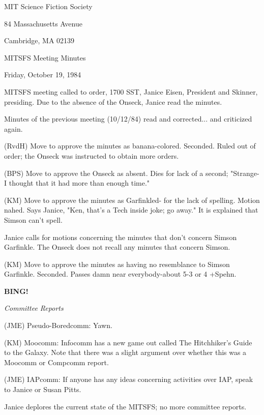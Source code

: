 \documentclass[12pt]{article}
\newcommand{\bing}{{\bf BING!} }
\newcommand{\goto}[1]{\bing \vskip 12pt \centerline{{\em{#1}}}}
\begin{document}
\begin{center}

MIT Science Fiction Society 

84 Massachusetts Avenue

Cambridge, MA 02139

\vspace{12pt}

MITSFS Meeting Minutes 

Friday, October 19, 1984

\end{center}
 
\vspace{18pt}

\setlength{\parskip}{6pt}

\noindent
MITSFS meeting called to order, 1700 SST,
Janice Eisen, President and Skinner, presiding. Due to the absence of the Onseck, Janice read the minutes.

Minutes of the previous meeting (10/12/84) read and corrected... and criticized again.

(RvdH) Move to approve the minutes as banana-colored. Seconded. Ruled out of order; the Onseck was instructed to obtain more orders.

(BPS) Move to approve the Onseck as absent. Dies for lack of a second; "Strange- I thought that it had more than enough time."

(KM) Move to approve the minutes as Garfinkled- for the lack of spelling. Motion nahed. Says Janice, "Ken, that's a Tech inside joke; go away." It is explained that Simson can't spell.

Janice calls for motions concerning the minutes that don't concern Simson Garfinkle. The Onseck does not recall any minutes that concern Simson.

(KM) Move to approve the minutes as having no resemblance to Simson Garfinkle. Seconded. Passes damn near everybody-about 5-3 or 4 +Spehn.

\goto{Committee Reports}

(JME) Pseudo-Boredcomm: Yawn.

(KM) Moocomm: Infocomm has a new game out called The Hitchhiker's Guide to the Galaxy. Note that there was a slight argument over whether this was a Moocomm or Compcomm report.

(JME) IAPcomm: If anyone has any ideas concerning activities over IAP, speak to Janice or Susan Pitts.

Janice deplores the current state of the MITSFS; no more committee reports.
\end{document}
